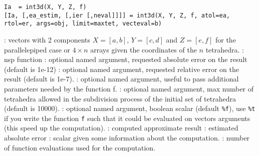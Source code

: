 
\begin{mandesc}
\end{mandesc}

\begin{calling_sequence}
\begin{verbatim}
Ia  = int3d(X, Y, Z, f)
[Ia, [,ea_estim, [,ier [,neval]]]] = int3d(X, Y, Z, f, atol=ea, rtol=er, args=obj, limit=maxtet, vecteval=b)
\end{verbatim}
\end{calling_sequence}
\begin{parameters}
  \begin{varlist}
    : vectors with 2 components $X=[a,b]$, $Y=[c,d]$ and $Z = [e,f]$ for
    the parallelepiped case or  $4 \times n$ arrays given the coordinates of the $n$ tetrahedra.
    : nsp function
    : optional named argument, requested absolute error
                      on the result (default is 1e-12)
    : optional named argument, requested relative error
                      on the result (default is 1e-7).
    : optional named argument, useful to pass
    additional parameters needed by the function f.
    : optional named argument, max number of
    tetrahedra allowed in the subdivision process of the initial set of
    tetrahedra (default is 10000).
    : optional named argument, boolean scalar
    (default \verb+%f+), use \verb+%t+ if you write the function
    \verb+f+ such that it could be evaluated on vectors arguments 
    (this speed up the computation).
    : computed approximate result
    : estimated absolute error
    : scalar given some information about the computation.
    : number of function evaluations used for the computation.
  \end{varlist}
\end{parameters}

